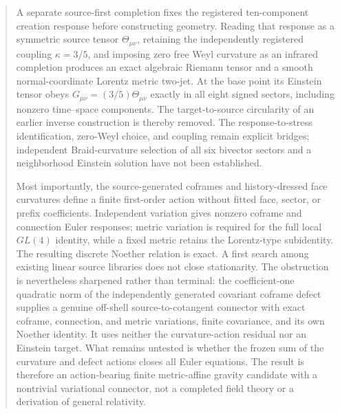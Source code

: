 \documentclass[11pt]{article}
\theoremstyle{definition}
\theoremstyle{remark}
\begin{document}
\begin{abstract}
A separate source-first completion fixes the registered ten-component creation response before constructing geometry. Reading that response as a symmetric source tensor $\Theta_{\mu\nu}$, retaining the independently registered coupling $\kappa=3/5$, and imposing zero free Weyl curvature as an infrared completion produces an exact algebraic Riemann tensor and a smooth normal-coordinate Lorentz metric two-jet. At the base point its Einstein tensor obeys $G_{\mu\nu}=(3/5)\Theta_{\mu\nu}$ exactly in all eight signed sectors, including nonzero time--space components. The target-to-source circularity of an earlier inverse construction is thereby removed. The response-to-stress identification, zero-Weyl choice, and coupling remain explicit bridges; independent Braid-curvature selection of all six bivector sectors and a neighborhood Einstein solution have not been established.

Most importantly, the source-generated coframes and history-dressed face curvatures define a finite first-order action without fitted face, sector, or prefix coefficients. Independent variation gives nonzero coframe and connection Euler responses; metric variation is required for the full local $GL(4)$ identity, while a fixed metric retains the Lorentz-type subidentity. The resulting discrete Noether relation is exact. A first search among existing linear source libraries does not close stationarity. The obstruction is nevertheless sharpened rather than terminal: the coefficient-one quadratic norm of the independently generated covariant coframe defect supplies a genuine off-shell source-to-cotangent connector with exact coframe, connection, and metric variations, finite covariance, and its own Noether identity. It uses neither the curvature-action residual nor an Einstein target. What remains untested is whether the frozen sum of the curvature and defect actions closes all Euler equations. The result is therefore an action-bearing finite metric-affine gravity candidate with a nontrivial variational connector, not a completed field theory or a derivation of general relativity.


\end{abstract}
\end{document}
